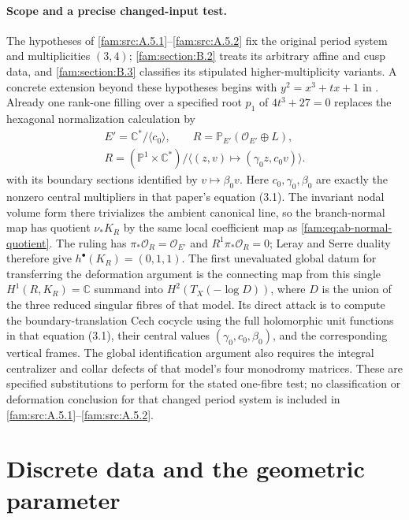 \paragraph{Scope and a precise changed-input test.}
The hypotheses of \ref{fam:src:A.5.1}--\ref{fam:src:A.5.2} fix the original period system and
multiplicities $(3,4)$; \ref{fam:section:B.2} treats its arbitrary affine and cusp data,
and \ref{fam:section:B.3} classifies its stipulated higher-multiplicity variants.
A concrete extension beyond these hypotheses begins with
$y^2=x^3+tx+1$ in \cite[Sections 2--3 and Proposition 6.1]{ViaclovskyTwo2026}.
Already one rank-one filling over a specified root $p_1$ of
$4t^3+27=0$ replaces the hexagonal normalization calculation by
\[
 \begin{gathered}
 E'=\mathbb C^*/\langle c_0\rangle,\qquad
 R=\mathbb P_{E'}(\mathcal O_{E'}\oplus L),\\
 R=(\mathbb P^1\times\mathbb C^*)/
       \langle(z,v)\mapsto(\gamma_0z,c_0v)\rangle.
 \end{gathered}
\]
with its boundary sections identified by $v\mapsto\beta_0v$.
Here $c_0,\gamma_0,\beta_0$ are exactly the nonzero central multipliers
in that paper's equation (3.1). The invariant nodal volume form there
trivializes the ambient canonical line, so the branch-normal map has
quotient $\nu_*K_R$ by the same local coefficient map as
\eqref{fam:eq:ab-normal-quotient}. The ruling has
$\pi_*\mathcal O_R=\mathcal O_{E'}$ and $R^1\pi_*\mathcal O_R=0$;
Leray and Serre duality therefore give $h^\bullet(K_R)=(0,1,1)$.
The first unevaluated global datum for transferring the deformation
argument is the connecting map from this single
$H^1(R,K_R)=\mathbb C$ summand into $H^2(T_X(-\log D))$, where
$D$ is the union of the three reduced singular fibres of that model.
Its direct attack is to compute the boundary-translation Cech cocycle
using the full holomorphic unit functions in that equation (3.1),
their central values $(\gamma_0,c_0,\beta_0)$, and the corresponding
vertical frames.
The global identification argument also requires the integral
centralizer and collar defects of that model's four monodromy matrices.
These are specified substitutions to perform for the stated one-fibre
test; no classification or deformation conclusion for that changed
period system is included in \ref{fam:src:A.5.1}--\ref{fam:src:A.5.2}.

\section{Discrete data and the geometric parameter}\label{fam:section:B}

